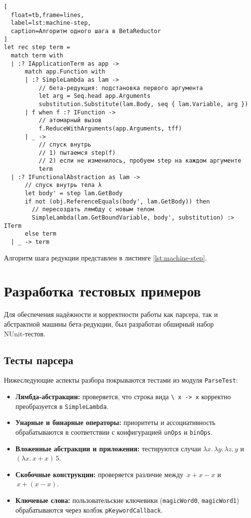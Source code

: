 \begin{lstlisting}[
  float=tb,frame=lines,
  label=lst:machine-step,
  caption=Алгоритм одного шага в BetaReductor
]
let rec step term =
  match term with
  | :? IApplicationTerm as app ->
      match app.Function with
      | :? SimpleLambda as lam ->
          // бета-редукция: подстановка первого аргумента
          let arg = Seq.head app.Arguments
          substitution.Substitute(lam.Body, seq { lam.Variable, arg })
      | f when f :? IFunction ->
          // атомарный вызов
          f.ReduceWithArguments(app.Arguments, tff)
      | _ ->
          // спуск внутрь
          // 1) пытаемся step(f)
          // 2) если не изменилось, пробуем step на каждом аргументе
          term
  | :? IFunctionalAbstraction as lam ->
      // спуск внутрь тела λ
      let body' = step lam.GetBody
      if not (obj.ReferenceEquals(body', lam.GetBody)) then
        // пересоздать лямбду с новым телом
        SimpleLambda(lam.GetBoundVariable, body', substitution) :> ITerm
      else term
  | _ -> term
\end{lstlisting}

Алгоритм шага редукции представлен в листинге \ref{lst:machine-step}.

\section{Разработка тестовых примеров}
\label{sec:test-examples}

Для обеспечения надёжности и корректности работы как парсера, так и абстрактной машины бета‑редукции, был разработан обширный набор NUnit‑тестов.

\subsection{Тесты парсера}

Нижеследующие аспекты разбора покрываются тестами из модуля \texttt{ParseTest}:

\begin{itemize}
  \item \textbf{Лямбда‑абстракции:} проверяется, что строка вида \verb|\ x -> x| корректно преобразуется в \texttt{SimpleLambda}.  
  \item \textbf{Унарные и бинарные операторы:} приоритеты и ассоциативность обрабатываются в соответствии с конфигурацией \texttt{unOps} и \texttt{binOps}.  
  \\
  \item \textbf{Вложенные абстракции и приложения:} тестируются случаи \(\lambda x.\,\lambda y.\,\lambda z.\,y\) и \((\lambda x.\,x+x)\,5\).  
  \item \textbf{Скобочные конструкции:} проверяется различие между \(\,x + x - x\) и \(\,x + (x - x)\).  
  \item \textbf{Ключевые слова:} пользовательские ключевики (\texttt{magicWord0}, \texttt{magicWord1}) обрабатываются через колбэк \texttt{pKeywordCallback}.  
\end{itemize}

